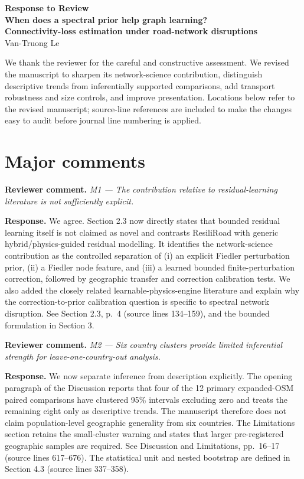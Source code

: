 \documentclass[10pt]{article}
\newcommand{\review}[1]{\textbf{Reviewer comment.} \emph{#1}}
\newcommand{\response}{\textbf{Response.} }
\begin{document}
\begin{center}
{\Large\bfseries Response to Review}\\[5pt]
{\bfseries When does a spectral prior help graph learning?\\
Connectivity-loss estimation under road-network disruptions}\\[5pt]
Van-Truong Le
\end{center}

We thank the reviewer for the careful and constructive assessment. We revised
the manuscript to sharpen its network-science contribution, distinguish
descriptive trends from inferentially supported comparisons, add transport
robustness and size controls, and improve presentation. Locations below refer
to the revised manuscript; source-line references are included to make the
changes easy to audit before journal line numbering is applied.

\section*{Major comments}

\review{M1 --- The contribution relative to residual-learning literature is
not sufficiently explicit.}

\response We agree. Section 2.3 now directly states that bounded residual
learning itself is not claimed as novel and contrasts ResiliRoad with generic
hybrid/physics-guided residual modelling. It identifies the network-science
contribution as the controlled separation of (i) an explicit Fiedler
perturbation prior, (ii) a Fiedler node feature, and (iii) a learned bounded
finite-perturbation correction, followed by geographic transfer and correction
calibration tests. We also added the closely related learnable-physics-engine
literature and explain why the correction-to-prior calibration question is
specific to spectral network disruption. See Section 2.3, p.~4
(source lines 134--159), and the bounded formulation in Section 3.

\review{M2 --- Six country clusters provide limited inferential strength for
leave-one-country-out analysis.}

\response We now separate inference from description explicitly. The opening
paragraph of the Discussion reports that four of the 12 primary expanded-OSM
paired comparisons have clustered 95\% intervals excluding zero and treats the
remaining eight only as descriptive trends. The manuscript therefore does not
claim population-level geographic generality from six countries. The
Limitations section retains the small-cluster warning and states that larger
pre-registered geographic samples are required. See Discussion and
Limitations, pp.~16--17 (source lines 617--676). The statistical unit and nested
bootstrap are defined in Section 4.3 (source lines 337--358).
\end{document}
